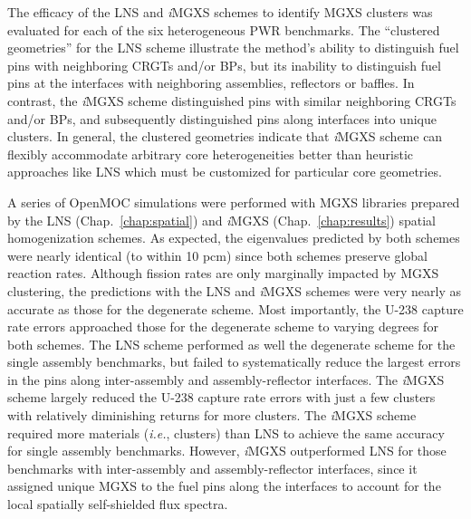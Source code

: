 

The efficacy of the \ac{LNS} and \textit{i}\ac{MGXS} schemes to identify \ac{MGXS} clusters was evaluated for each of the six heterogeneous \ac{PWR} benchmarks. The ``clustered geometries'' for the \ac{LNS} scheme illustrate the method's ability to distinguish fuel pins with neighboring \acp{CRGT} and/or \acp{BP}, but its inability to distinguish fuel pins at the interfaces with neighboring assemblies, reflectors or baffles. In contrast, the \textit{i}\ac{MGXS} scheme distinguished pins with similar neighboring \acp{CRGT} and/or \acp{BP}, and subsequently distinguished pins along interfaces into unique clusters. In general, the clustered geometries indicate that \textit{i}\ac{MGXS} scheme can flexibly accommodate arbitrary core heterogeneities better than heuristic approaches like \ac{LNS} which must be customized for particular core geometries.

A series of OpenMOC simulations were performed with \ac{MGXS} libraries prepared by the \ac{LNS} (Chap.~\ref{chap:spatial}) and \textit{i}\ac{MGXS} (Chap.~\ref{chap:results}) spatial homogenization schemes. As expected, the eigenvalues predicted by both schemes were nearly identical (to within 10 \ac{pcm}) since both schemes preserve global reaction rates. Although fission rates are only marginally impacted by \ac{MGXS} clustering, the predictions with the \ac{LNS} and \textit{i}\ac{MGXS} schemes were very nearly as accurate as those for the degenerate scheme. Most importantly, the U-238 capture rate errors approached those for the degenerate scheme to varying degrees for both schemes. The \ac{LNS} scheme performed as well the degenerate scheme for the single assembly benchmarks, but failed to systematically reduce the largest errors in the pins along inter-assembly and assembly-reflector interfaces. The \textit{i}\ac{MGXS} scheme largely reduced the U-238 capture rate errors with just a few clusters with relatively diminishing returns for more clusters. The \textit{i}\ac{MGXS} scheme required more materials (\textit{i.e.}, clusters) than \ac{LNS} to achieve the same accuracy for single assembly benchmarks. However, \textit{i}\ac{MGXS} outperformed \ac{LNS} for those benchmarks with inter-assembly and assembly-reflector interfaces, since it assigned unique \ac{MGXS} to the fuel pins along the interfaces to account for the local spatially self-shielded flux spectra.

